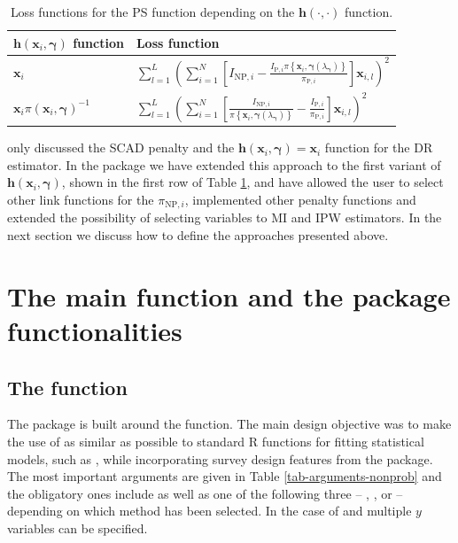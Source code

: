 \documentclass[nojss]{jss}
\begin{document}
\begin{table}[ht!]
\centering
\begin{tabular}{ll}
\hline
$\boldsymbol{h}(\boldsymbol{x}_i, \boldsymbol{\gamma})$ function &  Loss function\\
\hline
$\boldsymbol{x}_i$ & $\sum_{l=1}^L\left(\sum_{i=1}^N\left[I_{\text{NP},i} - \frac{I_{\text{P},i}\pi\left\{\boldsymbol{x}_i, \boldsymbol{\gamma}(\lambda_{\boldsymbol{\gamma}})\right\}}{\pi_{\text{P},i}}\right] \boldsymbol{x}_{i,l}\right)^2$\\
\hline
$\boldsymbol{x}_i \pi(\boldsymbol{x}_i, \boldsymbol{\gamma})^{-1}$ & $\sum_{l=1}^L\left(\sum_{i=1}^N\left[\frac{I_{\text{NP},i}}{\pi\left\{\boldsymbol{x}_i, \boldsymbol{\gamma}(\lambda_{\boldsymbol{\gamma}})\right\}}-\frac{I_{\text{P},i}}{\pi_{\text{P},i}}\right] \boldsymbol{x}_{i,l}\right)^2$ \\
\hline
\end{tabular}
\caption{Loss functions for the PS function depending on the $\boldsymbol{h}(\cdot,\cdot)$ function.}
\label{tab-varsel-loss-ipw}
\end{table}

\citet{yang_doubly_2020} only discussed the SCAD penalty and the
\(\boldsymbol{h}(\boldsymbol{x}_i, \boldsymbol{\gamma})=\boldsymbol{x}_i\)
function for the DR estimator. In the  package we have
extended this approach to the first variant of
\(\boldsymbol{h}(\boldsymbol{x}_i, \boldsymbol{\gamma})\), shown in the
first row of Table \ref{tab-varsel-loss-ipw}, and have allowed the user
to select other link functions for the \(\pi_{\text{NP},i}\),
implemented other penalty functions and extended the possibility of
selecting variables to MI and IPW estimators. In the next section we
discuss how to define the approaches presented above.

\section{The main function and the package
functionalities}\label{sec-package}

\subsection[The nonprob function]{The  function}

The  package is built around the 
function. The main design objective was to make the use of
 as similar as possible to standard R functions for
fitting statistical models, such as , while
incorporating survey design features from the  package. The
most important arguments are given in Table \ref{tab-arguments-nonprob}
and the obligatory ones include  as well as one of the
following three -- , , or  --
depending on which method has been selected. In the case of
 and  multiple \(y\) variables can be
specified.
\end{document}
